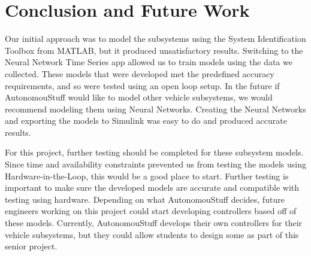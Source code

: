 \documentclass[journal,twoside,web]{ieeecolor}
\begin{document}
\section{Conclusion and Future Work}
\label{sec:conclustionAndFutureWork}
Our initial approach was to model the subsystems using the System Identification Toolbox from MATLAB, but it produced unsatisfactory results. Switching to the Neural Network Time Series app allowed us to train models using the data we collected. These models that were developed met the predefined accuracy requirements, and so were tested using an open loop setup. In the future if AutonomouStuff would like to model other vehicle subsystems, we would recommend modeling them using Neural Networks. Creating the Neural Networks and exporting the models to Simulink was easy to do and produced accurate results. 

For this project, further testing should be completed for these subsystem models. Since time and availability constraints prevented us from testing the models using Hardware-in-the-Loop, this would be a good place to start. Further testing is important to make sure the developed models are accurate and compatible with testing using hardware. Depending on what AutonomouStuff decides, future engineers working on this project could start developing controllers based off of these models. Currently, AutonomouStuff develops their own controllers for their vehicle subsystems, but they could allow students to design some as part of this senior project. 








%
\end{document}
